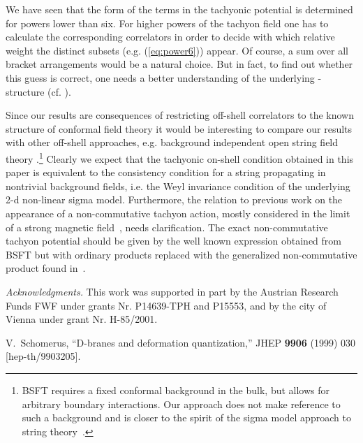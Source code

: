 \documentclass[a4paper,11pt]{article}               \def\new#1\endnew{{\bf #1}}
\begin{document}
We have seen that the form of the terms in the tachyonic potential is
determined for powers lower than six. For higher powers 
of the tachyon field one has to calculate the
corresponding correlators in order to decide with which relative
weight the distinct subsets (e.g. (\ref{eq:power6})) appear. 
Of course, a sum over all bracket arrangements would be a natural choice.
But in fact, to find out whether this
guess is correct, one needs a better understanding of the underlying
\coordHE{}-structure (cf. \cite{stasheff,Cornalba:2002sm}).

Since our results are consequences of restricting off-shell correlators 
to the known structure of conformal field theory it would be
interesting to compare our results with other off-shell approaches, 
e.g. background independent open string field theory
\cite{Witten:1992qy,Witten:1993cr,
Shatashvili:1993kk,Shatashvili:1993ps}.\footnote{%
  BSFT requires a fixed conformal background in the bulk, 
  but allows for arbitrary boundary interactions. Our approach does 
  not make reference to such a background and is closer to the spirit of the 
  sigma model approach to string theory~\cite{Tseytlin:1989rr}.
} 
Clearly we expect that the tachyonic on-shell condition obtained in this 
paper is equivalent to the consistency condition for a string propagating 
in nontrivial background fields, i.e. the Weyl invariance condition of the 
underlying 2-d non-linear sigma model. Furthermore, the relation to previous 
work on the appearance of a non-commutative tachyon action, mostly considered 
in the limit of a strong magnetic field~\cite{Cornalba:2001ad,Okuyama:2001ch}, 
needs clarification. The exact non-commutative tachyon potential 
should be given by the well known expression obtained from BSFT but with 
ordinary products replaced with the generalized non-commutative product found 
in~\cite{Herbst:2001ai}. 


\emph{Acknowledgments.} This work was supported in part by the Austrian 
Research Funds FWF under grants Nr. P14639-TPH and P15553,
and by the city of Vienna under grant Nr. H-85/2001.

\newpage

\addtolength{\itemsep}{-7pt}

\vspace{-4truemm}

V.~Schomerus,
``D-branes and deformation quantization,''
JHEP {\bf 9906} (1999) 030
[hep-th/9903205].
\end{document}
